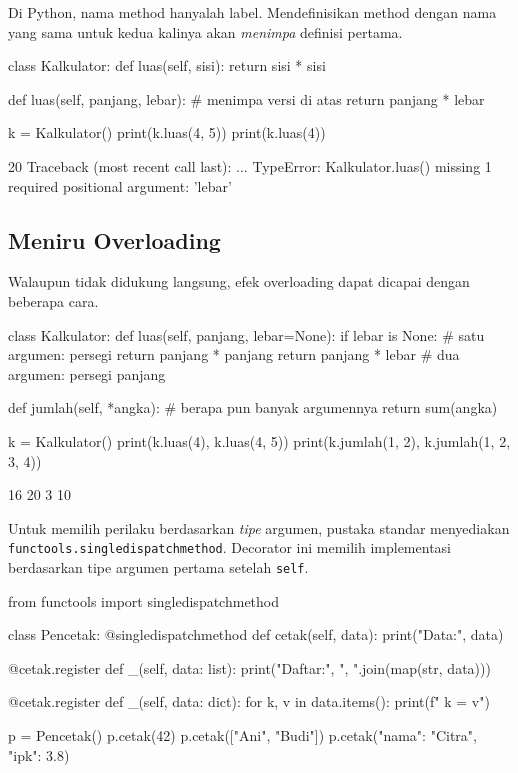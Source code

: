 Di Python, nama method hanyalah label. Mendefinisikan method dengan nama yang sama untuk kedua kalinya akan \emph{menimpa} definisi pertama.

\begin{kode}
class Kalkulator:
    def luas(self, sisi):
        return sisi * sisi

    def luas(self, panjang, lebar):     # menimpa versi di atas
        return panjang * lebar

k = Kalkulator()
print(k.luas(4, 5))
print(k.luas(4))
\end{kode}

\begin{keluaran}
20
Traceback (most recent call last):
  ...
TypeError: Kalkulator.luas() missing 1 required positional argument: 'lebar'
\end{keluaran}

\subsection{Meniru Overloading}

Walaupun tidak didukung langsung, efek overloading dapat dicapai dengan beberapa cara.

\begin{kode}
class Kalkulator:
    def luas(self, panjang, lebar=None):
        if lebar is None:                 # satu argumen: persegi
            return panjang * panjang
        return panjang * lebar            # dua argumen: persegi panjang

    def jumlah(self, *angka):             # berapa pun banyak argumennya
        return sum(angka)

k = Kalkulator()
print(k.luas(4), k.luas(4, 5))
print(k.jumlah(1, 2), k.jumlah(1, 2, 3, 4))
\end{kode}

\begin{keluaran}
16 20
3 10
\end{keluaran}

Untuk memilih perilaku berdasarkan \emph{tipe} argumen, pustaka standar menyediakan \texttt{functools.singledispatchmethod}. Decorator ini memilih implementasi berdasarkan tipe argumen pertama setelah \texttt{self}.

\begin{kode}
from functools import singledispatchmethod

class Pencetak:
    @singledispatchmethod
    def cetak(self, data):
        print("Data:", data)

    @cetak.register
    def _(self, data: list):
        print("Daftar:", ", ".join(map(str, data)))

    @cetak.register
    def _(self, data: dict):
        for k, v in data.items():
            print(f"  {k} = {v}")

p = Pencetak()
p.cetak(42)
p.cetak(["Ani", "Budi"])
p.cetak({"nama": "Citra", "ipk": 3.8})
\end{kode}

